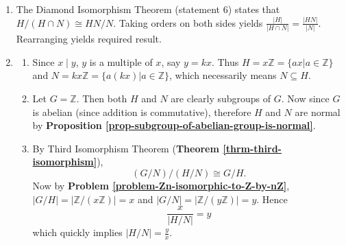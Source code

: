 \begin{enumerate}
    \item The Diamond Isomorphism Theorem (statement 6) states that $H / (H\cap N) \cong HN / N$. Taking orders on both sides yields $\frac{|H|}{|H \cap N|} = \frac{|HN|}{|N|}$. Rearranging yields required result.

    \item \begin{enumerate}[label=(\roman*)]
        \item Since $x\;|\;y$, $y$ is a multiple of $x$, say $y = kx$. Thus $H = x\mathbb{Z} = \{ax \vert a \in \mathbb{Z}\}$ and $N = kx\mathbb{Z} = \{a(kx) \vert a \in \mathbb{Z}\}$, which necessarily means $N \subseteq H$.
        \item Let $G = \mathbb{Z}$. Then both $H$ and $N$ are clearly subgroups of $G$. Now since $G$ is abelian (since addition is commutative), therefore $H$ and $N$ are normal by \textbf{Proposition \ref{prop-subgroup-of-abelian-group-is-normal}}.
        \item By Third Isomorphism Theorem (\textbf{Theorem \ref{thrm-third-isomorphism}}),
        \[
            (G/N)/(H/N) \cong G/H.
        \]
        Now by \textbf{Problem \ref{problem-Zn-isomorphic-to-Z-by-nZ}}, $|G/H| = |\mathbb{Z}/(x\mathbb{Z})| = x$ and $|G/N| = |\mathbb{Z}/(y\mathbb{Z})| = y$. Hence
        \[
            \frac{x}{|H/N|} = y
        \]
        which quickly implies $|H/N| = \frac yx$.
    \end{enumerate}
\end{enumerate}

